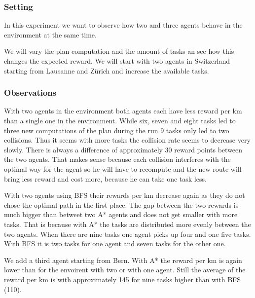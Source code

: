 \documentclass[11pt]{article}
\begin{document}
\subsubsection{Setting}
In this experiment we want to observe how two and three agents behave in the environment at the same time.


We will vary the plan computation and the amount of tasks an see how this changes the expected reward. We will start with two agents in Switzerland starting from Lausanne and Zürich and increase the available tasks.


\subsubsection{Observations}
With two agents in the environment both agents each have less reward per km than a single one in the environment. While six, seven and eight tasks led to three new computations of the plan during the run 9 tasks only led to two collisions. Thus it seems with more tasks the collision rate seems to decrease very slowly. There is always a difference of approximately 30 reward points between the two agents. That makes sense because each collision interferes with the optimal way for the agent so he will have to recompute and the new route will bring less reward and cost more, because he can take one task less. 

With two agents using BFS their rewards per km decrease again as they do not chose the optimal path in the first place. The gap between the two rewards is much bigger than betweet two A* agents and does not get smaller with more tasks. That is because with A* the tasks are distributed more evenly between the two agents. When there are nine tasks one agent picks up four and one five tasks. With BFS it is two tasks for one agent and seven tasks for the other one. 

We add a third agent starting from Bern. With A* the reward per km is again lower than for the envoirent with two or with one agent. Still the average of the reward per km is with approximately 145 for nine tasks higher than with BFS (110).
\end{document}
